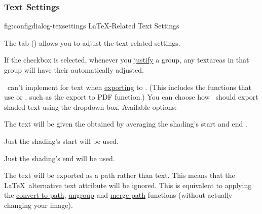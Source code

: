 \subsubsection{Text Settings}\label{sec:texconfigtext}


\FloatFig
  {fig:configdialog-texsettings}
  {}
  {LaTeX-Related Text Settings}

The  tab
()
allows you to adjust the text-related settings.


If the  \gls{checkbox} is selected,
whenever you \hyperref[sec:alignobjects]{justify} a \gls{group}, any
\glspl{textarea} in that group will have their
 automatically adjusted.


\FlowframTk\ can't implement  for text when
\hyperref[sec:exportpgf]{exporting} to . (This includes the
 functions that use  or , such as
the export to PDF function.) You can choose how \FlowframTk\ should export
shaded text using the  dropdown
box. Available options:

\begin{deflist}
\itemtitle
 {}

\begin{itemdesc}
The text will be given the  obtained by averaging the
shading's start and end .
\end{itemdesc}

\itemtitle
 {}

\begin{itemdesc}
Just the shading's start  will be used.
\end{itemdesc}

\itemtitle
 {}

\begin{itemdesc}
Just the shading's end  will be used.
\end{itemdesc}

\itemtitle
 {}

\begin{itemdesc}
The text will be exported as a path rather than text. This means
that the \LaTeX\ alternative text attribute will be ignored. This is
equivalent to applying the 
\hyperref[sec:converttopath]{convert to path}, 
\hyperref[sec:grouping]{ungroup} and 
\hyperref[sec:mergepaths]{merge path}
functions (without actually changing your image).
\end{itemdesc}

\end{deflist}

